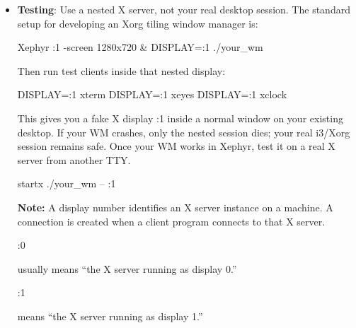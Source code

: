 \documentclass{report}
\begin{document}
    \pagebreak 
    \begin{itemize}
        \item \textbf{Testing}:  Use a nested X server, not your real desktop session. The standard setup for developing an Xorg tiling window manager is:
            \bigbreak \noindent 
            \begin{bashcode}
                Xephyr :1 -screen 1280x720 &
                DISPLAY=:1 ./your_wm
            \end{bashcode}
            \bigbreak \noindent 
            Then run test clients inside that nested display:
            \bigbreak \noindent 
            \begin{bashcode}
                DISPLAY=:1 xterm
                DISPLAY=:1 xeyes
                DISPLAY=:1 xclock
            \end{bashcode}
            \bigbreak \noindent 
            This gives you a fake X display :1 inside a normal window on your existing desktop. If your WM crashes, only the nested session dies; your real i3/Xorg session remains safe.
            \bigbreak \noindent 
            Once your WM works in Xephyr, test it on a real X server from another TTY.
            \bigbreak \noindent 
            \begin{cppcode}
                startx ./your_wm -- :1
            \end{cppcode}
            \bigbreak \noindent 
            \textbf{Note:} A display number identifies an X server instance on a machine. A connection is created when a client program connects to that X server.
            \bigbreak \noindent 
            \begin{cppcode}
            :0
            \end{cppcode}
            \bigbreak \noindent 
            usually means “the X server running as display 0.”
            \bigbreak \noindent 
            \begin{cppcode}
            :1
            \end{cppcode}
            \bigbreak \noindent 
            means “the X server running as display 1.”


    \end{itemize}

    \pagebreak 
\end{document}
